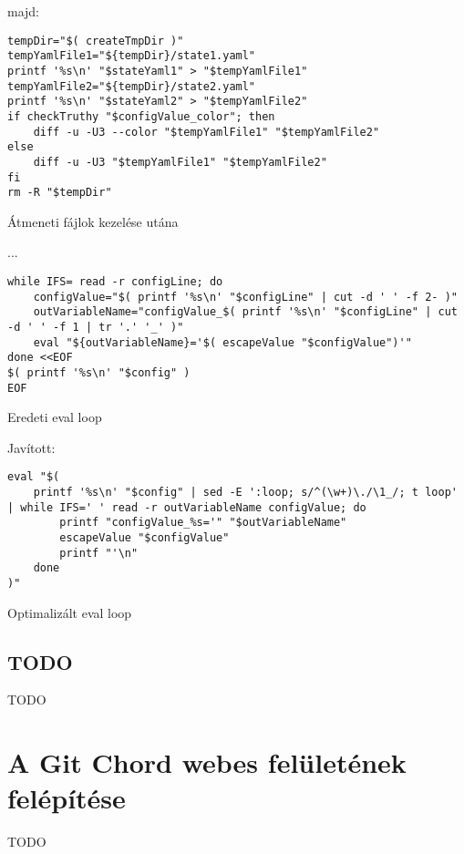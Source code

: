\documentclass[final]{elteikthesis}[2025/03/25]
\begin{document}
majd:

\begin{listing}[H]
\begin{verbatim}
tempDir="$( createTmpDir )"
tempYamlFile1="${tempDir}/state1.yaml"
printf '%s\n' "$stateYaml1" > "$tempYamlFile1"
tempYamlFile2="${tempDir}/state2.yaml"
printf '%s\n' "$stateYaml2" > "$tempYamlFile2"
if checkTruthy "$configValue_color"; then
    diff -u -U3 --color "$tempYamlFile1" "$tempYamlFile2"
else
    diff -u -U3 "$tempYamlFile1" "$tempYamlFile2"
fi
rm -R "$tempDir"
\end{verbatim}
\caption{Átmeneti fájlok kezelése utána}
\end{listing}

...

\begin{listing}[H]
\begin{verbatim}
while IFS= read -r configLine; do
    configValue="$( printf '%s\n' "$configLine" | cut -d ' ' -f 2- )"
    outVariableName="configValue_$( printf '%s\n' "$configLine" | cut -d ' ' -f 1 | tr '.' '_' )"
    eval "${outVariableName}='$( escapeValue "$configValue")'"
done <<EOF
$( printf '%s\n' "$config" )
EOF
\end{verbatim}
\caption{Eredeti eval loop}
\end{listing}

Javított:

\begin{listing}[H]
\begin{verbatim}
eval "$(
    printf '%s\n' "$config" | sed -E ':loop; s/^(\w+)\./\1_/; t loop' | while IFS=' ' read -r outVariableName configValue; do
        printf "configValue_%s='" "$outVariableName"
        escapeValue "$configValue"
        printf "'\n"
    done
)"
\end{verbatim}
\caption{Optimalizált eval loop}
\end{listing}

\subsection{TODO}

TODO

\section{A Git Chord webes felületének felépítése}

TODO

\cleardoublepage
\end{document}
